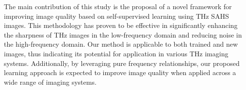 The main contribution of this study is the proposal of a novel framework for improving image quality based on self-supervised learning using THz SAHS images. This methodology has proven to be effective in significantly enhancing the sharpness of THz images in the low-frequency domain and reducing noise in the high-frequency domain. Our method is applicable to both trained and new images, thus indicating its potential for application in various THz imaging systems. Additionally, by leveraging pure frequency relationships, our proposed learning approach is expected to improve image quality when applied across a wide range of imaging systems.